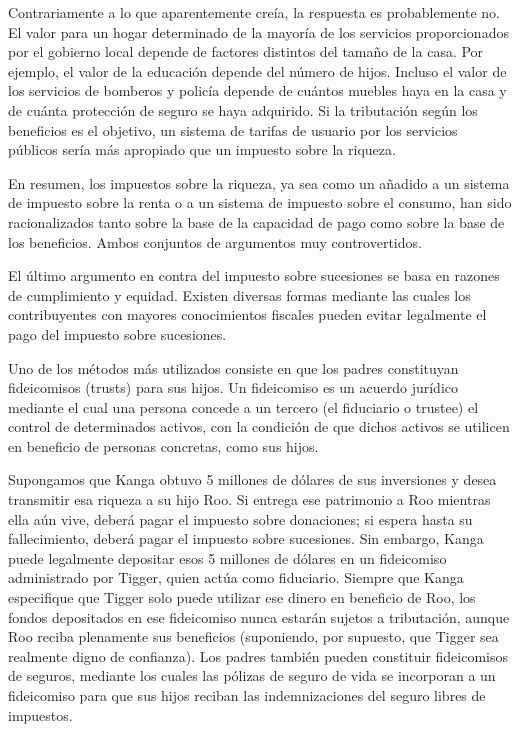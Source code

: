 \documentclass[10pt,a4paper]{article}
\begin{document}
Contrariamente a lo que aparentemente creía, la respuesta es probablemente no. El valor para un hogar determinado de la mayoría de los servicios proporcionados por el gobierno local depende de factores distintos del tamaño de la casa. Por ejemplo, el valor de la educación depende del número de hijos. Incluso el valor de los servicios de bomberos y policía depende de cuántos muebles haya en la casa y de cuánta protección de seguro se haya adquirido. Si la tributación según los beneficios es el objetivo, un sistema de tarifas de usuario por los servicios públicos sería más apropiado que un impuesto sobre la riqueza.

En resumen, los impuestos sobre la riqueza, ya sea como un añadido a un sistema de impuesto sobre la renta o a un sistema de impuesto sobre el consumo, han sido racionalizados tanto sobre la base de la capacidad de pago como sobre la base de los beneficios. Ambos conjuntos de argumentos muy controvertidos.





















El último argumento en contra del impuesto sobre sucesiones se basa en razones de cumplimiento y equidad. Existen diversas formas mediante las cuales los contribuyentes con mayores conocimientos fiscales pueden evitar legalmente el pago del impuesto sobre sucesiones.

Uno de los métodos más utilizados consiste en que los padres constituyan fideicomisos (trusts) para sus hijos. Un fideicomiso es un acuerdo jurídico mediante el cual una persona concede a un tercero (el fiduciario o trustee) el control de determinados activos, con la condición de que dichos activos se utilicen en beneficio de personas concretas, como sus hijos.

Supongamos que Kanga obtuvo 5 millones de dólares de sus inversiones y desea transmitir esa riqueza a su hijo Roo. Si entrega ese patrimonio a Roo mientras ella aún vive, deberá pagar el impuesto sobre donaciones; si espera hasta su fallecimiento, deberá pagar el impuesto sobre sucesiones. Sin embargo, Kanga puede legalmente depositar esos 5 millones de dólares en un fideicomiso administrado por Tigger, quien actúa como fiduciario. Siempre que Kanga especifique que Tigger solo puede utilizar ese dinero en beneficio de Roo, los fondos depositados en ese fideicomiso nunca estarán sujetos a tributación, aunque Roo reciba plenamente sus beneficios (suponiendo, por supuesto, que Tigger sea realmente digno de confianza). Los padres también pueden constituir fideicomisos de seguros, mediante los cuales las pólizas de seguro de vida se incorporan a un fideicomiso para que sus hijos reciban las indemnizaciones del seguro libres de impuestos.
\end{document}
